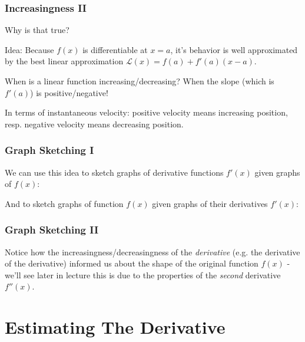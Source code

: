 \documentclass{ltx-talk}
\begin{document}
\begin{frame}
  \frametitle{Increasingness II}

  Why is that true? \pause

  Idea: Because $f(x)$ is differentiable at $x = a$, \pause
  it's behavior is well approximated by the best linear approximation
  $\mathscr{L}(x) = f(a) + f'(a)(x - a)$. \pause

  When is a linear function increasing/decreasing? \pause When the slope (which is $f'(a)$) is positive/negative! \pause

  In terms of instantaneous velocity: \pause positive velocity means increasing position, resp. negative velocity means decreasing position.
\end{frame}

\begin{frame}
  \frametitle{Graph Sketching I}

  We can use this idea to sketch graphs of derivative functions $f'(x)$
  given graphs of $f(x)$: \pause
  \vfill \pause

  And to sketch graphs of function $f(x)$ given graphs of their derivatives $f'(x)$:
  \vfill 
\end{frame}

\begin{frame}
  \frametitle{Graph Sketching II}

  Notice how the increasingness/decreasingness of the \textit{derivative} (e.g. the derivative of the derivative) informed us about the shape of the original function $f(x)$ \pause - we'll see later in lecture this is due to the properties of the \textit{second} derivative $f''(x)$.
\end{frame}

\section{Estimating The Derivative}
\end{document}
